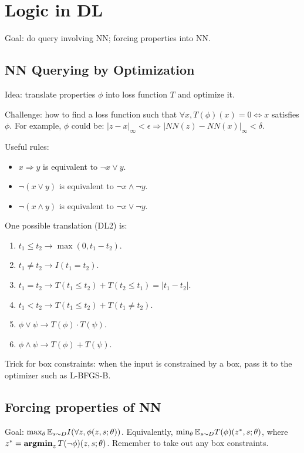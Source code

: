 \section{Logic in DL}

Goal: do query involving NN; forcing properties into NN.

\subsection*{NN Querying by Optimization}

Idea: translate properties $\phi$ into loss function $T$ and optimize it. 

Challenge: how to find a loss function such that $\forall x, T(\phi)(x)=0\Leftrightarrow x$ satisfies $\phi$. For example, $\phi$ could be: $|z-x|_{\infty}<\epsilon \Rightarrow |NN(z)-NN(x)|_{\infty}<\delta$. 

Useful rules:
\begin{itemize}
    \item $x\Rightarrow y$ is equivalent to $\neg x \lor y$.
    \item $\neg (x \lor y)$ is equivalent to $\neg x \land \neg y$.
    \item $\neg (x \land y)$ is equivalent to $\neg x \lor \neg y$. 
\end{itemize}


One possible translation (DL2) is:
\begin{enumerate}
    \item $t_1\le t_2 \longrightarrow \max(0, t_1-t_2)$.
    \item $t_1\ne t_2 \longrightarrow I(t_1=t_2)$.
    \item $t_1=t_2 \longrightarrow T(t_1\le t_2) + T(t_2\le t_1) = |t_1-t_2|$.
    \item $t_1<t_2 \longrightarrow T(t_1\le t_2) + T(t_1\ne t_2)$.
    \item $\phi \lor \psi \longrightarrow T(\phi)\cdot T(\psi)$.
    \item $\phi \land \psi \longrightarrow T(\phi) + T(\psi)$.
\end{enumerate}

Trick for box constraints: when the input is constrained by a box, pass it to the optimizer such as L-BFGS-B.

\subsection*{Forcing properties of NN}

Goal: $\max_\theta \mathbb{E}_{s\sim D}I(\forall z, \phi(z, s;\theta))$. Equivalently, $\min_\theta \mathbb{E}_{s\sim D} T(\phi)(z^*, s; \theta)$, where $z^* = \operatorname{\textbf{argmin}}_z T(\neg \phi)(z,s;\theta)$. Remember to take out any box constraints.